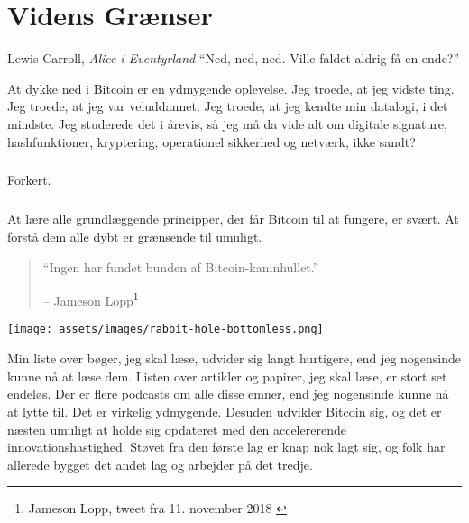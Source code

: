\chapter{Videns Grænser}
\label{les:7}

\begin{chapquote}{Lewis Carroll, \textit{Alice i Eventyrland}}
\enquote{Ned, ned, ned. Ville faldet aldrig få en ende?}
\end{chapquote}

At dykke ned i Bitcoin er en ydmygende oplevelse. Jeg troede, at jeg vidste 
ting. Jeg troede, at jeg var veluddannet. Jeg troede, at jeg kendte min 
datalogi, i det mindste. Jeg studerede det i årevis, så jeg må da vide alt om 
digitale signature, hashfunktioner, kryptering, operationel sikkerhed og 
netværk, ikke sandt?

\paragraph{}
Forkert.

\paragraph{}
At lære alle grundlæggende principper, der får Bitcoin til at fungere, er 
svært. At forstå dem alle dybt er grænsende til umuligt.

\begin{quotation}\begin{samepage}
\enquote{Ingen har fundet bunden af Bitcoin-kaninhullet.}
\begin{flushright} -- Jameson Lopp\footnote{Jameson Lopp, tweet fra 11.
    november 2018 \cite{lopp-tweet}}
\end{flushright}\end{samepage}\end{quotation}

\begin{center}
\centering
\texttt{[image: assets/images/rabbit-hole-bottomless.png]}
\label{fig:rabbit-hole-bottomless}
\end{center}


Min liste over bøger, jeg skal læse, udvider sig langt hurtigere, end jeg 
nogensinde kunne nå at læse dem. Listen over artikler og papirer, jeg skal 
læse, er stort set endeløs. Der er flere podcasts om alle disse emner, end 
jeg nogensinde kunne nå at lytte til. Det er virkelig ydmygende. Desuden 
udvikler Bitcoin sig, og det er næsten umuligt at holde sig opdateret med den 
accelererende innovationshastighed. Støvet fra den første lag er knap nok lagt 
sig, og folk har allerede bygget det andet lag og arbejder på det tredje.


